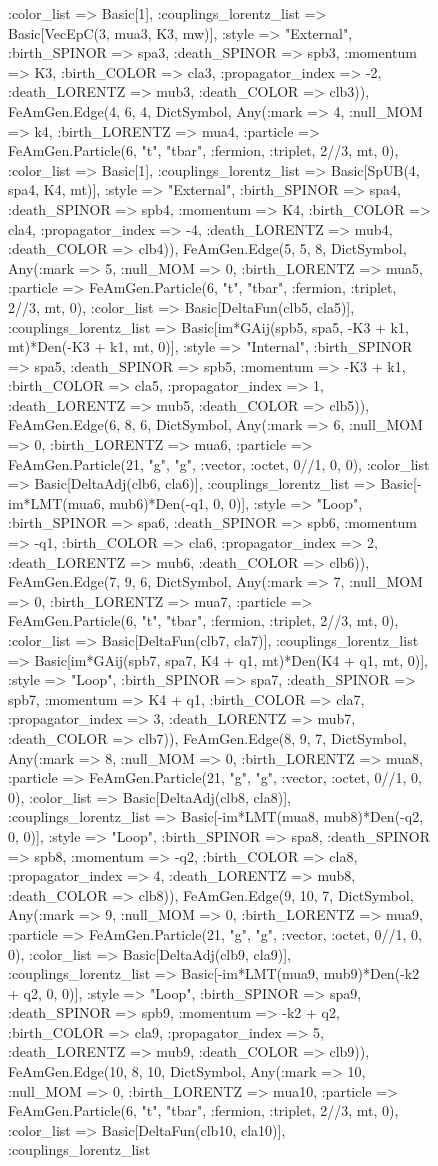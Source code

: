 \documentclass{revtex4}
\begin{document}
\begin{figure}[!htb]
\begin{center}
{:color_list => Basic[1], :couplings_lorentz_list => Basic[VecEpC(3, mua3, K3, mw)], :style => "External", :birth_SPINOR => spa3, :death_SPINOR => spb3, :momentum => K3, :birth_COLOR => cla3, :propagator_index => -2, :death_LORENTZ => mub3, :death_COLOR => clb3)), FeAmGen.Edge(4, 6, 4, Dict{Symbol, Any}(:mark => 4, :null_MOM => k4, :birth_LORENTZ => mua4, :particle => FeAmGen.Particle(6, "t", "tbar", :fermion, :triplet, 2//3, mt, 0), :color_list => Basic[1], :couplings_lorentz_list => Basic[SpUB(4, spa4, K4, mt)], :style => "External", :birth_SPINOR => spa4, :death_SPINOR => spb4, :momentum => K4, :birth_COLOR => cla4, :propagator_index => -4, :death_LORENTZ => mub4, :death_COLOR => clb4)), FeAmGen.Edge(5, 5, 8, Dict{Symbol, Any}(:mark => 5, :null_MOM => 0, :birth_LORENTZ => mua5, :particle => FeAmGen.Particle(6, "t", "tbar", :fermion, :triplet, 2//3, mt, 0), :color_list => Basic[DeltaFun(clb5, cla5)], :couplings_lorentz_list => Basic[im*GAij(spb5, spa5, -K3 + k1, mt)*Den(-K3 + k1, mt, 0)], :style => "Internal", :birth_SPINOR => spa5, :death_SPINOR => spb5, :momentum => -K3 + k1, :birth_COLOR => cla5, :propagator_index => 1, :death_LORENTZ => mub5, :death_COLOR => clb5)), FeAmGen.Edge(6, 8, 6, Dict{Symbol, Any}(:mark => 6, :null_MOM => 0, :birth_LORENTZ => mua6, :particle => FeAmGen.Particle(21, "g", "g", :vector, :octet, 0//1, 0, 0), :color_list => Basic[DeltaAdj(clb6, cla6)], :couplings_lorentz_list => Basic[-im*LMT(mua6, mub6)*Den(-q1, 0, 0)], :style => "Loop", :birth_SPINOR => spa6, :death_SPINOR => spb6, :momentum => -q1, :birth_COLOR => cla6, :propagator_index => 2, :death_LORENTZ => mub6, :death_COLOR => clb6)), FeAmGen.Edge(7, 9, 6, Dict{Symbol, Any}(:mark => 7, :null_MOM => 0, :birth_LORENTZ => mua7, :particle => FeAmGen.Particle(6, "t", "tbar", :fermion, :triplet, 2//3, mt, 0), :color_list => Basic[DeltaFun(clb7, cla7)], :couplings_lorentz_list => Basic[im*GAij(spb7, spa7, K4 + q1, mt)*Den(K4 + q1, mt, 0)], :style => "Loop", :birth_SPINOR => spa7, :death_SPINOR => spb7, :momentum => K4 + q1, :birth_COLOR => cla7, :propagator_index => 3, :death_LORENTZ => mub7, :death_COLOR => clb7)), FeAmGen.Edge(8, 9, 7, Dict{Symbol, Any}(:mark => 8, :null_MOM => 0, :birth_LORENTZ => mua8, :particle => FeAmGen.Particle(21, "g", "g", :vector, :octet, 0//1, 0, 0), :color_list => Basic[DeltaAdj(clb8, cla8)], :couplings_lorentz_list => Basic[-im*LMT(mua8, mub8)*Den(-q2, 0, 0)], :style => "Loop", :birth_SPINOR => spa8, :death_SPINOR => spb8, :momentum => -q2, :birth_COLOR => cla8, :propagator_index => 4, :death_LORENTZ => mub8, :death_COLOR => clb8)), FeAmGen.Edge(9, 10, 7, Dict{Symbol, Any}(:mark => 9, :null_MOM => 0, :birth_LORENTZ => mua9, :particle => FeAmGen.Particle(21, "g", "g", :vector, :octet, 0//1, 0, 0), :color_list => Basic[DeltaAdj(clb9, cla9)], :couplings_lorentz_list => Basic[-im*LMT(mua9, mub9)*Den(-k2 + q2, 0, 0)], :style => "Loop", :birth_SPINOR => spa9, :death_SPINOR => spb9, :momentum => -k2 + q2, :birth_COLOR => cla9, :propagator_index => 5, :death_LORENTZ => mub9, :death_COLOR => clb9)), FeAmGen.Edge(10, 8, 10, Dict{Symbol, Any}(:mark => 10, :null_MOM => 0, :birth_LORENTZ => mua10, :particle => FeAmGen.Particle(6, "t", "tbar", :fermion, :triplet, 2//3, mt, 0), :color_list => Basic[DeltaFun(clb10, cla10)], :couplings_lorentz_list }
\end{center}
\end{figure}
\end{document}
